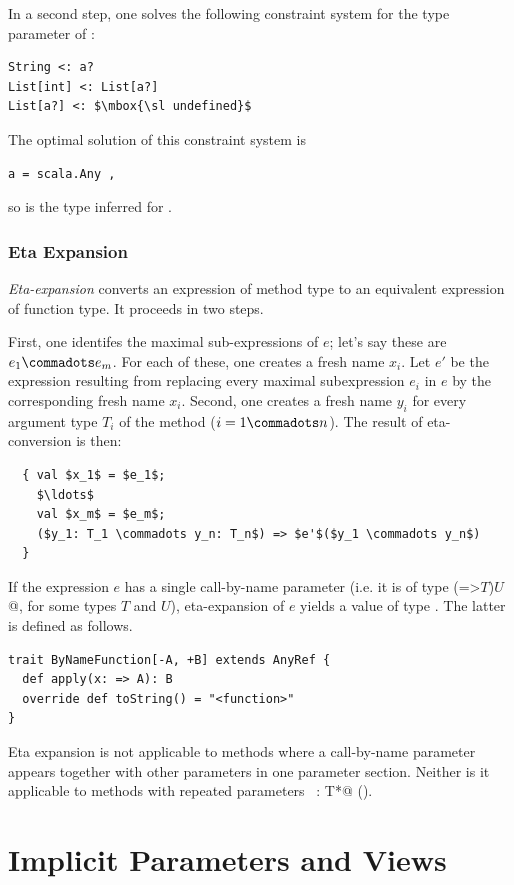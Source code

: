In a second step, one solves the following constraint system for
the type parameter  of :
\begin{lstlisting}
String <: a?
List[int] <: List[a?]
List[a?] <: $\mbox{\sl undefined}$
\end{lstlisting}
The optimal solution of this constraint system is
\begin{lstlisting}
a = scala.Any ,
\end{lstlisting}
so  is the type inferred for .

\subsection{Eta Expansion}\label{sec:eta-expand}

  {\em Eta-expansion} converts an expression of method type to an
  equivalent expression of function type. It proceeds in two steps.

  First, one identifes the maximal sub-expressions of $e$; let's
  say these are $e_1 \commadots e_m$. For each of these, one creates a
  fresh name $x_i$. Let $e'$ be the expression resulting from
  replacing every maximal subexpression $e_i$ in $e$ by the
  corresponding fresh name $x_i$. Second, one creates a fresh name $y_i$
  for every argument type $T_i$ of the method ($i = 1 \commadots
  n$). The result of eta-conversion is then:
\begin{lstlisting}
  { val $x_1$ = $e_1$; 
    $\ldots$ 
    val $x_m$ = $e_m$; 
    ($y_1: T_1 \commadots y_n: T_n$) => $e'$($y_1 \commadots y_n$) 
  }
\end{lstlisting}

If the expression $e$ has a single call-by-name parameter (i.e. it is
of type \lstinline@(=>$T$)$U$@, for some types $T$ and $U$),
eta-expansion of $e$ yields a value of type
\lstinline@ByNameFunction@. The latter is defined as follows.
\begin{lstlisting}
trait ByNameFunction[-A, +B] extends AnyRef {
  def apply(x: => A): B
  override def toString() = "<function>"
}
\end{lstlisting}
Eta expansion is not applicable to methods where a call-by-name
parameter appears together with other parameters in one parameter
section. Neither is it applicable to methods with
repeated parameters ~\lstinline@x: T*@ (). 

\chapter{Implicit Parameters and Views}\label{sec:implicits}


